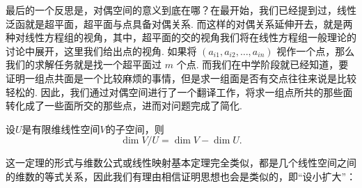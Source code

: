 
最后的一个反思是，对偶空间的意义到底在哪？在最开始，我们已经提到过，线性泛函就是超平面，超平面与点具备对偶关系. 而这样的对偶关系延伸开去，就是两种对线性方程组的视角，其中，超平面的交的视角我们将在线性方程组一般理论的讨论中展开，这里我们给出点的视角. 如果将 $(a_{i1}, a_{i2},\ldots, a_{in})$ 视作一个点，那么我们的求解任务就是找一个超平面过 $m$ 个点. 而我们在中学阶段就已经知道，要证明一组点共面是一个比较麻烦的事情，但是求一组面是否有交点往往来说是比较轻松的. 因此，我们通过对偶空间进行了一个翻译工作，将求一组点所共的那些面转化成了一些面所交的那些点，进而对问题完成了简化.

\begin{theorem}{}{}
    设$U$是有限维线性空间$V$的子空间，则
    \[\dim V/U=\dim V-\dim U.\]
\end{theorem}
这一定理的形式与维数公式或线性映射基本定理完全类似，都是几个线性空间之间的维数的等式关系，因此我们有理由相信证明思想也会是类似的，即``设小扩大''：


